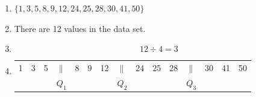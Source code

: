 \begin{description}[noitemsep]
\begin{description}[noitemsep]
{\begin{mdframed}[linewidth=4, leftmargin=40, rightmargin=40]
\begin{exercise}
\begin{enumerate}[noitemsep, label=\textbf{Step} \textbf{\arabic*}. ]
            \leftskip=20pt\rightskip=\leftskip\item  
          \label{m39400*id213613}
            $\{1,3,5,8,9,12,24,25,28,30,41,50\}$
          \par 
          \item  
          \label{m39400*id213680}There are 12 values in the data set.\par 
          \item  
          \label{m39400*id213688}\nopagebreak\noindent{}
            
    \begin{equation}
    12÷4=3\tag{16.6}
      \end{equation}
          \item  
          \begin{table}
        \begin{center}
      \label{m39400*id213712}
    \noindent
      \tablelasttail{}
      \begin{xtabular}[t]{|l|l|l|l|l|l|l|l|l|l|l|l|l|l|l|} &
        3 &
        5 &
                    $\parallel $
                   &
        8 &
        9 &
        12 &
                    $\parallel $
                   &
        24 &
        25 &
        28 &
                    $\parallel $
                   &
        30 &
        41 &
        50%
     \tabularnewline{}
         &
         &
         &
                    ${Q}_{1}$
                   &
         &
         &
         &
                    ${Q}_{2}$
                   &
         &
         &
         &
                    ${Q}_{3}$
                   &
         &
         &
     \tabularnewline{}

\end{xtabular}
\end{center}
\end{table}
\end{enumerate}
\end{exercise}
\end{mdframed}}
\end{description}
\end{description}
